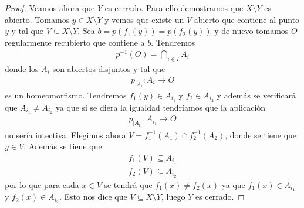 \begin{lema}
\begin{proof}
        Veamos ahora que $Y$ es cerrado. Para ello demostramos que $X\setminus Y$ es abierto. Tomamos $y\in X\setminus Y$ y vemos que existe un $V$ abierto que contiene al punto $y$ y tal que $V\subseteq X \setminus Y$. Sea $b=p(f_1(y))=p(f_2(y))$ y de nuevo tomamos $O$ regularmente recubierto que contiene a $b$. Tendremos
        \begin{gather*}
            p^{-1}(O) = \bigcap\limits_{i\in I} A_i
        \end{gather*}
        donde los $A_i$ son abiertos disjuntos y tal que 
        \begin{gather*}
            p_{|A_i}: A_i\to O 
        \end{gather*}
        es un homeomorfismo. Tendremos $f_1(y)\in A_{i_1}$ y $f_2\in A_{i_2}$ y además se verificará que $A_{i_1}\neq A_{i_2}$ ya que si se diera la igualdad tendríamos que la aplicación
        \begin{gather*}
            p_{|A_{i_1}}: A_{i_1} \to O
        \end{gather*}
        no sería intectiva. Elegimos ahora $V=f_1^{-1}(A_1) \cap f_2^{-1}(A_2)$, donde se tiene que $y\in V$. Además se tiene que 
        \begin{gather*}
            f_1(V)\subseteq A_{i_1}\\
            f_2(V)\subseteq A_{i_2}
        \end{gather*}
        por lo que para cada $x\in V$ se tendrá que $f_1(x)\neq f_2(x)$ ya que $f_1(x)\in A_{i_1}$ y $f_2(x)\in A_{i_2}$. Esto nos dice que $V\subseteq X\setminus Y$, luego $Y$ es cerrado.
    \end{proof}
\end{lema}

